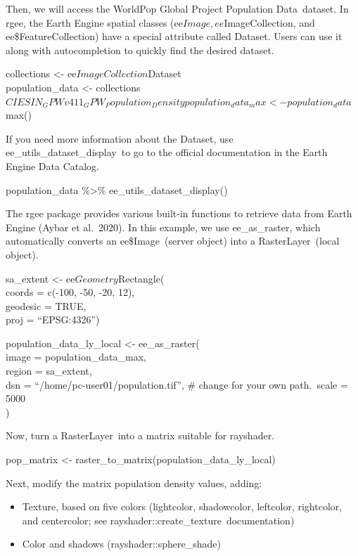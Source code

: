 \documentclass[
  letterpaper,
  DIV=11,
  numbers=noendperiod]{scrreprt}
\providecommand{\tightlist}{%
  \setlength{\itemsep}{0pt}\setlength{\parskip}{0pt}}\usepackage{longtable,booktabs,array}
\begin{document}
Then, we will access the WorldPop Global Project Population
Data~dataset. In rgee, the Earth Engine spatial classes
(ee\(Image, ee\)ImageCollection, and ee\$FeatureCollection) have a
special attribute called Dataset. Users can use it along with
autocompletion to quickly find the desired dataset.

collections \textless- ee\(ImageCollection\)Dataset\\
population\_data \textless-
collections\(CIESIN_GPWv411_GPW_Population_Density population_data_max <- population_data\)max()

If you need more information about the Dataset, use
ee\_utils\_dataset\_display~to go to the official documentation in the
Earth Engine Data Catalog.

population\_data \%\textgreater\% ee\_utils\_dataset\_display()

The rgee package provides various built-in functions to retrieve data
from Earth Engine (Aybar et al.~2020). In this example, we use
ee\_as\_raster, which automatically converts an ee\$Image~(server
object) into a RasterLayer~(local object).

sa\_extent \textless- ee\(Geometry\)Rectangle(\\
\hspace*{0.333em}coords = c(-100, -50, -20, 12),\\
\hspace*{0.333em}geodesic = TRUE,\\
\hspace*{0.333em}proj = ``EPSG:4326'')

population\_data\_ly\_local \textless- ee\_as\_raster(\\
\hspace*{0.333em}image = population\_data\_max,\\
\hspace*{0.333em}region = sa\_extent,\\
\hspace*{0.333em}dsn = ``/home/pc-user01/population.tif'', \# change for
your own path.~scale = 5000\\
)

Now, turn a RasterLayer~into a matrix suitable for rayshader.

pop\_matrix \textless- raster\_to\_matrix(population\_data\_ly\_local)

Next, modify the matrix population density values, adding:

\begin{itemize}
\tightlist
\item
  Texture, based on five colors (lightcolor, shadowcolor, leftcolor,
  rightcolor, and centercolor; see
  rayshader::create\_texture~documentation)
\item
  Color and shadows (rayshader::sphere\_shade)
\end{itemize}
\end{document}
